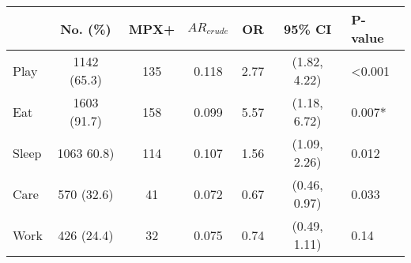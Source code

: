\begin{tabular}{lccccc}

\toprule
 & No. (\%) & MPX+ & $AR_{crude}$ & OR & 95\% CI & P-value \\
\midrule
Play & 1142 (65.3) & 135 & 0.118 & 2.77 & (1.82, 4.22) & <0.001 \\
Eat & 1603 (91.7) & 158 & 0.099 & 5.57 & (1.18, 6.72) & 0.007* \\
Sleep & 1063 60.8) & 114 & 0.107 & 1.56 & (1.09, 2.26) & 0.012 \\
Care & 570 (32.6) & 41 & 0.072 & 0.67 & (0.46, 0.97) & 0.033 \\
Work & 426 (24.4) & 32 & 0.075 & 0.74 & (0.49, 1.11) & 0.14 \\

\bottomrule
\end{tabular}